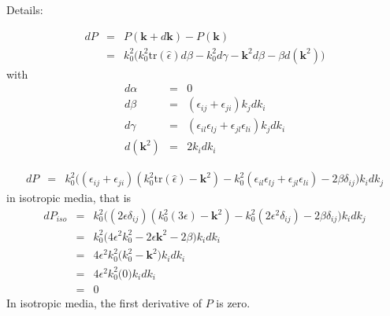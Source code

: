\documentclass[12pt,a4paper,twoside,openright,BCOR10mm,headsepline,titlepage,abstracton,chapterprefix,final]{scrreprt}
\newcommand\Vector[1]{{\mathbf{#1}}}
\newcommand\wavenumber{k}
\newcommand\Wavevector{\Vector{\wavenumber}}
\newcommand\Tensor[1]{\hat{#1}}
\newcommand\scalarrelativepermittivity{\epsilon}
\newcommand\relativepermittivity{\Tensor{\scalarrelativepermittivity}}
\begin{document}
Details:

\begin{eqnarray}
 dP &=& P(\Wavevector + d\Wavevector) - P(\Wavevector) \\
    &=& \wavenumber_0^2 \bigg( \wavenumber_0^2 \text{tr}(\relativepermittivity) d\beta - \wavenumber_0^2 d\gamma - \Wavevector^2 d\beta - \beta d(\Wavevector^2) \bigg) 
\end{eqnarray}
with
\begin{eqnarray}
 d\alpha &=& 0 \\
 d\beta &=& (\scalarrelativepermittivity_{ij} + \scalarrelativepermittivity_{ji}) \wavenumber_j d\wavenumber_i\\
 d\gamma &=& (\scalarrelativepermittivity_{il}\scalarrelativepermittivity_{lj} + \scalarrelativepermittivity_{jl}\scalarrelativepermittivity_{li}) \wavenumber_j d\wavenumber_i\\
 d(\Wavevector^2) &=& 2 \wavenumber_i d\wavenumber_i
\end{eqnarray}

\begin{eqnarray}
 dP &=& \wavenumber_0^2 
    \bigg( 
       (\scalarrelativepermittivity_{ij} + \scalarrelativepermittivity_{ji}) ( \wavenumber_0^2 \text{tr}(\relativepermittivity) 
     - \Wavevector^2 ) - \wavenumber_0^2 (\scalarrelativepermittivity_{il}\scalarrelativepermittivity_{lj} + \scalarrelativepermittivity_{jl}\scalarrelativepermittivity_{li}) 
     - 2 \beta \delta_{ij}
   \bigg)
   \wavenumber_i d\wavenumber_j 
\end{eqnarray}
in isotropic media, that is
\begin{eqnarray}
 dP_{iso} &=& \wavenumber_0^2 
    \bigg( 
       ( 2 \scalarrelativepermittivity \delta_{ij}) ( \wavenumber_0^2 (3 \scalarrelativepermittivity) 
     - \Wavevector^2 ) - \wavenumber_0^2 ( 2 \scalarrelativepermittivity^2 \delta_{ij})
     - 2 \beta \delta_{ij}
   \bigg)
   \wavenumber_i d\wavenumber_j 
 \\
 &=& \wavenumber_0^2 
    \bigg( 
       4 \scalarrelativepermittivity^2 \wavenumber_0^2 
     - 2 \scalarrelativepermittivity \Wavevector^2
     - 2 \beta
   \bigg)
   \wavenumber_i d\wavenumber_i
 \\
 &=& 4 \scalarrelativepermittivity^2 \wavenumber_0^2 
    \bigg( 
       \wavenumber_0^2 - \Wavevector^2
   \bigg)
   \wavenumber_i d\wavenumber_i
 \\
 &=& 4 \scalarrelativepermittivity^2 \wavenumber_0^2 
    \bigg( 0 \bigg)
   \wavenumber_i d\wavenumber_i
 \\
 &=& 0
\end{eqnarray}
In isotropic media, the first derivative of $P$ is zero.
\end{document}
